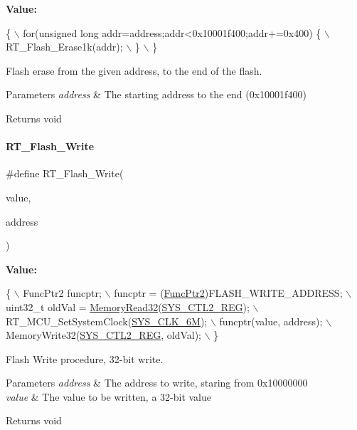 {\bfseries Value\+:}
\begin{DoxyCode}
\{                                                                   \(\backslash\)
        for(\textcolor{keywordtype}{unsigned} \textcolor{keywordtype}{long} addr=address;addr<0x10001f400;addr+=0x400) \{  \(\backslash\)
            RT\_Flash\_Erase1k(addr);                                     \(\backslash\)
        \}                                                               \(\backslash\)
    \}
\end{DoxyCode}


Flash erase from the given address, to the end of the flash. 


\begin{DoxyParams}{Parameters}
{\em address} & The starting address to the end (0x10001f400) \\
\hline
\end{DoxyParams}
\begin{DoxyReturn}{Returns}
void 
\end{DoxyReturn}
\mbox{\label{a00008_a13fb43316f72b3b1b9467a91fca08d5c}} 
\paragraph{\texorpdfstring{R\+T\+\_\+\+Flash\+\_\+\+Write}{RT\_Flash\_Write}}
{\footnotesize\ttfamily \#define R\+T\+\_\+\+Flash\+\_\+\+Write(\begin{DoxyParamCaption}\item[{}]{value,  }\item[{}]{address }\end{DoxyParamCaption})}

{\bfseries Value\+:}
\begin{DoxyCode}
\{                                                   \(\backslash\)
        FuncPtr2 funcptr;                               \(\backslash\)
        funcptr = (\mbox{\hyperlink{a00020_a331a88eeefe11112bb8fe1b43dd777b8}{FuncPtr2}})FLASH\_WRITE\_ADDRESS;        \(\backslash\)
        uint32\_t oldVal = \mbox{\hyperlink{a00020_a2d484dc15bdf30ee11ab3b05f31f0e16}{MemoryRead32}}(\mbox{\hyperlink{a00020_adadaa0ab1ebbd7ba9b70dfd24c3ed44da7dd70f67b5962a7974603376399afb49}{SYS\_CTL2\_REG}});   \(\backslash\)
        RT\_MCU\_SetSystemClock(\mbox{\hyperlink{a00020_ae3a2d501b8662e11b969fb4a5e195e5bad1640aa8c46162a7551abca12293ef39}{SYS\_CLK\_6M}});              \(\backslash\)
        funcptr(value, address);                        \(\backslash\)
        MemoryWrite32(\mbox{\hyperlink{a00020_adadaa0ab1ebbd7ba9b70dfd24c3ed44da7dd70f67b5962a7974603376399afb49}{SYS\_CTL2\_REG}}, oldVal);            \(\backslash\)
    \}
\end{DoxyCode}


Flash Write procedure, 32-\/bit write. 


\begin{DoxyParams}{Parameters}
{\em address} & The address to write, staring from 0x10000000 \\
\hline
{\em value} & The value to be written, a 32-\/bit value \\
\hline
\end{DoxyParams}
\begin{DoxyReturn}{Returns}
void 
\end{DoxyReturn}

